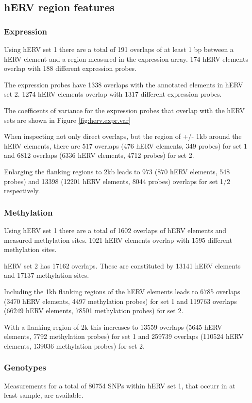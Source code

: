 \documentclass[a4paper,12pt]{article}
\begin{document}
\subsection{hERV region features}
\subsubsection{Expression}
Using hERV set 1 there are a total of 191 overlaps of at least 1 bp between a hERV element and a region measured in the expression array. 174 hERV elements overlap with 188 different expression probes. 

The expression probes have 1338 overlaps with the annotated elements in hERV set 2. 1274 hERV elements overlap with 1317 different expression probes.

The coefficents of variance for the expression probes that overlap with the hERV sets are shown in Figure \ref{fig:herv.expr.var}

When inspecting not only direct overlaps, but the region of +/- 1kb around the hERV elements, there are 517 overlaps (476 hERV elements, 349 probes) for set 1 and 6812 overlaps (6336 hERV elements, 4712 probes) for set 2.

Enlarging the flanking regions to 2kb leads to 973 (870 hERV elements, 548 probes) and 13398 (12201 hERV elements, 8044 probes) overlaps for set 1/2 respectively.



\subsubsection{Methylation}
Using hERV set 1 there are a total of 1602 overlaps of hERV elements and measured methylation sites. 1021 hERV elements overlap with 1595 different methylation sites.

hERV set 2 has 17162 overlaps. These are constituted by 13141 hERV elements and 17137 methylation sites.

Including the 1kb flanking regions of the hERV elements leads to 6785 overlaps (3470 hERV elements, 4497 methylation probes) for set 1 and 119763 overlaps (66249 hERV elements, 78501 methylation probes) for set 2.

With a flanking region of 2k this increases to 13559 overlaps (5645 hERV elements, 7792 methylation probes) for set 1 and 259739 overlaps (110524 hERV elements, 139036 methylation probes) for set 2. 

\subsubsection{Genotypes}
Measurements for a total of 80754 SNPs within hERV set 1, that occurr in at least  sample, are available.
\end{document}
